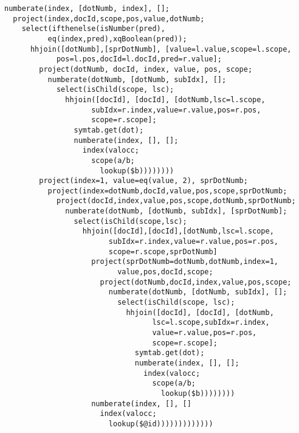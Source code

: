 \begin{Verbatim}
numberate(index, [dotNumb, index], [];
  project(index,docId,scope,pos,value,dotNumb;
    select(ifthenelse(isNumber(pred),
          eq(index,pred),xqBoolean(pred));
      hhjoin([dotNumb],[sprDotNumb], [value=l.value,scope=l.scope,
            pos=l.pos,docId=l.docId,pred=r.value];
        project(dotNumb, docId, index, value, pos, scope;
          numberate(dotNumb, [dotNumb, subIdx], [];
            select(isChild(scope, lsc);
              hhjoin([docId], [docId], [dotNumb,lsc=l.scope,
                    subIdx=r.index,value=r.value,pos=r.pos,
                    scope=r.scope];
                symtab.get(dot);
                numberate(index, [], [];
                  index(valocc;
                    scope(a/b;
                      lookup($b))))))))
        project(index=1, value=eq(value, 2), sprDotNumb;
          project(index=dotNumb,docId,value,pos,scope,sprDotNumb;
            project(docId,index,value,pos,scope,dotNumb,sprDotNumb;
              numberate(dotNumb, [dotNumb, subIdx], [sprDotNumb];
                select(isChild(scope,lsc);
                  hhjoin([docId],[docId],[dotNumb,lsc=l.scope,
                        subIdx=r.index,value=r.value,pos=r.pos,
                        scope=r.scope,sprDotNumb]
                    project(sprDotNumb=dotNumb,dotNumb,index=1,
                          value,pos,docId,scope;
                      project(dotNumb,docId,index,value,pos,scope;
                        numberate(dotNumb, [dotNumb, subIdx], [];
                          select(isChild(scope, lsc);
                            hhjoin([docId], [docId], [dotNumb,
                                  lsc=l.scope,subIdx=r.index,
                                  value=r.value,pos=r.pos,
                                  scope=r.scope];
                              symtab.get(dot);
                              numberate(index, [], [];
                                index(valocc;
                                  scope(a/b;
                                    lookup($b))))))))
                    numberate(index, [], []
                      index(valocc;
                        lookup($@id)))))))))))))
\end{Verbatim}
